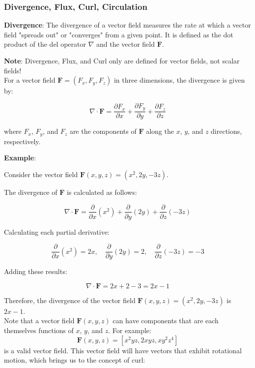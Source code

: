 \documentclass[12pt]{article}
\begin{document}
\subsubsection{Divergence, Flux, Curl, Circulation}

\textbf{Divergence}: The divergence of a vector field measures the rate at which a vector field "spreads out" or "converges" from a given point. It is defined as the dot product of the del operator \(\nabla\) and the vector field \(\mathbf{F}\). 

\textbf{Note}: Divergence, Flux, and Curl only are defined for vector fields, not scalar fields!\\

For a vector field \(\mathbf{F} = (F_x, F_y, F_z)\) in three dimensions, the divergence is given by:

\[
\nabla \cdot \mathbf{F} = \frac{\partial F_x}{\partial x} + \frac{\partial F_y}{\partial y} + \frac{\partial F_z}{\partial z}
\]

where \(F_x\), \(F_y\), and \(F_z\) are the components of \(\mathbf{F}\) along the \(x\), \(y\), and \(z\) directions, respectively.

\textbf{Example}:

Consider the vector field \(\mathbf{F}(x, y, z) = (x^2, 2y, -3z)\).

The divergence of \(\mathbf{F}\) is calculated as follows:

\[
\nabla \cdot \mathbf{F} = \frac{\partial}{\partial x}(x^2) + \frac{\partial}{\partial y}(2y) + \frac{\partial}{\partial z}(-3z)
\]

Calculating each partial derivative:

\[
\frac{\partial}{\partial x}(x^2) = 2x, \quad \frac{\partial}{\partial y}(2y) = 2, \quad \frac{\partial}{\partial z}(-3z) = -3
\]

Adding these results:

\[
\nabla \cdot \mathbf{F} = 2x + 2 - 3 = 2x - 1
\]

Therefore, the divergence of the vector field \(\mathbf{F}(x, y, z) = (x^2, 2y, -3z)\) is \(2x - 1\).\\

Note that a vector field \(\mathbf{F}(x, y, z)\) can have components that are each themselves functions of \(x\), \(y\), and \(z\). For example:
\[
\mathbf{F}(x, y, z) = [x^2yz, 2xyz, xy^2z^4]
\]
is a valid vector field. This vector field will have vectors that exhibit rotational motion, which brings us to the concept of curl:
\end{document}
